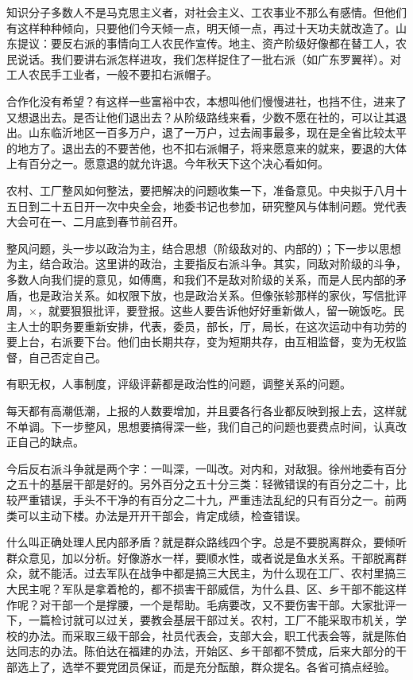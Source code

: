 知识分子多数人不是马克思主义者，对社会主义、工农事业不那么有感情。但他们有这样种种倾向，只要他们今天倾一点，明天倾一点，再过十天功夫就改造了。山东提议：要反右派的事情向工人农民作宣传。地主、资产阶级好像都在替工人，农民说话。我们要讲右派怎样进攻，我们怎样捉住了一批右派（如广东罗翼祥）。对工人农民手工业者，一般不要扣右派帽子。

合作化没有希望？有这样一些富裕中农，本想叫他们慢慢进社，也挡不住，进来了又想退出去。是否让他们退出去？从阶级路线来看，少数不愿在社的，可以让其退出。山东临沂地区一百多万户，退了一万户，过去闹事最多，现在是全省比较太平的地方了。退出去的不要苦他，也不扣右派帽子，将来愿意来的就来，要退的大体上有百分之一。愿意退的就允许退。今年秋天下这个决心看如何。

农村、工厂整风如何整法，要把解决的问题收集一下，准备意见。中央拟于八月十五日到二十五日开一次中央全会，地委书记也参加，研究整风与体制问题。党代表大会可在一、二月底到春节前召开。

整风问题，头一步以政治为主，结合思想（阶级敌对的、内部的）；下一步以思想为主，结合政治。这里讲的政治，主要指反右派斗争。其实，同敌对阶级的斗争，多数人向我们提的意见，如傅鹰，和我们不是敌对阶级的关系，而是人民内部的矛盾，也是政治关系。如权限下放，也是政治关系。但像张轸那样的家伙，写信批评周，×，就要狠狠批评，要登报。这些人要告诉他好好重新做人，留一碗饭吃。民主人士的职务要重新安排，代表，委员，部长，厅，局长，在这次运动中有功劳的要上台，右派要下台。他们由长期共存，变为短期共存，由互相监督，变为无权监督，自己否定自己。

有职无权，人事制度，评级评薪都是政治性的问题，调整关系的问题。

每天都有高潮低潮，上报的人数要增加，并且要各行各业都反映到报上去，这样就不单调。下一步整风，思想要搞得深一些，我们自己的问题也要费点时间，认真改正自己的缺点。

今后反右派斗争就是两个字：一叫深，一叫改。对内和，对敌狠。徐州地委有百分之五十的基层干部是好的。另外百分之五十分三类：轻微错误的有百分之二十，比较严重错误，手头不干净的有百分之二十九，严重违法乱纪的只有百分之一。前两类可以主动下楼。办法是开开干部会，肯定成绩，检查错误。

什么叫正确处理人民内部矛盾？就是群众路线四个字。总是不要脱离群众，要倾听群众意见，加以分析。好像游水一样，要顺水性，或者说是鱼水关系。干部脱离群众，就不能活。过去军队在战争中都是搞三大民主，为什么现在工厂、农村里搞三大民主呢？军队是拿着枪的，都不损害干部威信，为什么县、区、乡干部不能这样作呢？对干部一个是撑腰，一个是帮助。毛病要改，又不要伤害干部。大家批评一下，一篇检讨就可以过关，要教会基层干部过关。农村，工厂不能采取市机关，学校的办法。而采取三级干部会，社员代表会，支部大会，职工代表会等，就是陈伯达同志的办法。陈伯达在福建的办法，开始区、乡干部都不赞成，后来大部分的干部选上了，选举不要党团员保证，而是充分酝酿，群众提名。各省可搞点经验。

